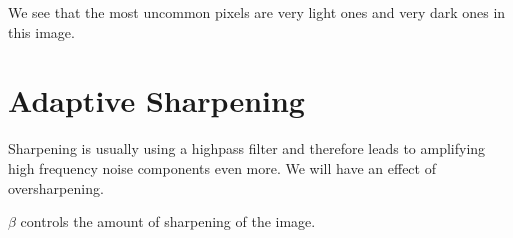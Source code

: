 We see that the most uncommon pixels are very light ones and very dark ones in this image.

\section{Adaptive Sharpening}

Sharpening is usually using a highpass filter and therefore leads to amplifying high frequency noise components even more.
We will have an effect of oversharpening.

\(\beta \) controls the amount of sharpening of the image.


